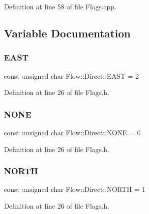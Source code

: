 Definition at line 58 of file Flags.\+cpp.



\subsection{Variable Documentation}
\hypertarget{namespace_flow_1_1_direct_a8ff328289a90b44b52de5251b6da59ec}{}\label{namespace_flow_1_1_direct_a8ff328289a90b44b52de5251b6da59ec} 
\subsubsection{\texorpdfstring{E\+A\+ST}{EAST}}
{\footnotesize\ttfamily const unsigned char Flow\+::\+Direct\+::\+E\+A\+ST = 2}



Definition at line 26 of file Flags.\+h.

\hypertarget{namespace_flow_1_1_direct_a3a2e55bf055fca941f5bd430389462ea}{}\label{namespace_flow_1_1_direct_a3a2e55bf055fca941f5bd430389462ea} 
\subsubsection{\texorpdfstring{N\+O\+NE}{NONE}}
{\footnotesize\ttfamily const unsigned char Flow\+::\+Direct\+::\+N\+O\+NE = 0}



Definition at line 26 of file Flags.\+h.

\hypertarget{namespace_flow_1_1_direct_aeaeaa2d58de609af52cf2666bf3868a7}{}\label{namespace_flow_1_1_direct_aeaeaa2d58de609af52cf2666bf3868a7} 
\subsubsection{\texorpdfstring{N\+O\+R\+TH}{NORTH}}
{\footnotesize\ttfamily const unsigned char Flow\+::\+Direct\+::\+N\+O\+R\+TH = 1}



Definition at line 26 of file Flags.\+h.

\hypertarget{namespace_flow_1_1_direct_ac93371fec14643176c2413f84b02b9ad}{}\label{namespace_flow_1_1_direct_ac93371fec14643176c2413f84b02b9ad} 
